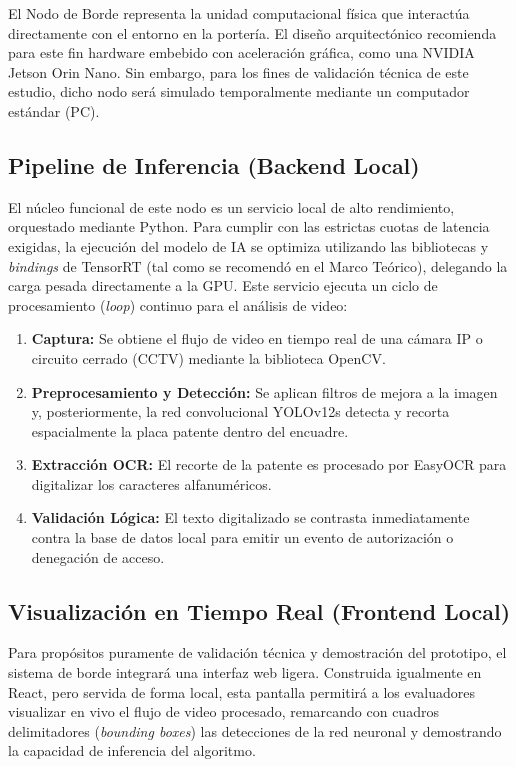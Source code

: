 El Nodo de Borde representa la unidad computacional física que interactúa directamente con el entorno en la portería. El diseño arquitectónico recomienda para este fin hardware embebido con aceleración gráfica, como una NVIDIA Jetson Orin Nano. Sin embargo, para los fines de validación técnica de este estudio, dicho nodo será simulado temporalmente mediante un computador estándar (PC).

\subsection{Pipeline de Inferencia (Backend Local)}
El núcleo funcional de este nodo es un servicio local de alto rendimiento, orquestado mediante Python. Para cumplir con las estrictas cuotas de latencia exigidas, la ejecución del modelo de IA se optimiza utilizando las bibliotecas y \textit{bindings} de TensorRT (tal como se recomendó en el Marco Teórico), delegando la carga pesada directamente a la GPU. Este servicio ejecuta un ciclo de procesamiento (\textit{loop}) continuo para el análisis de video:
\begin{enumerate}
    \item \textbf{Captura:} Se obtiene el flujo de video en tiempo real de una cámara IP o circuito cerrado (CCTV) mediante la biblioteca OpenCV.
    \item \textbf{Preprocesamiento y Detección:} Se aplican filtros de mejora a la imagen y, posteriormente, la red convolucional YOLOv12s detecta y recorta espacialmente la placa patente dentro del encuadre.
    \item \textbf{Extracción OCR:} El recorte de la patente es procesado por EasyOCR para digitalizar los caracteres alfanuméricos.
    \item \textbf{Validación Lógica:} El texto digitalizado se contrasta inmediatamente contra la base de datos local para emitir un evento de autorización o denegación de acceso.
\end{enumerate}

\subsection{Visualización en Tiempo Real (Frontend Local)}
Para propósitos puramente de validación técnica y demostración del prototipo, el sistema de borde integrará una interfaz web ligera. Construida igualmente en React, pero servida de forma local, esta pantalla permitirá a los evaluadores visualizar en vivo el flujo de video procesado, remarcando con cuadros delimitadores (\textit{bounding boxes}) las detecciones de la red neuronal y demostrando la capacidad de inferencia del algoritmo.

